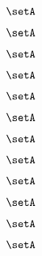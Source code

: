 \begin{forslides}
    \begin{equation}
        \label{eq:slides-translation-151}
        \setA
    \end{equation}

    \begin{equation}
        \label{eq:slides-translation-152}
        \setA
    \end{equation}

    \begin{equation}
        \label{eq:slides-translation-153}
        \setA
    \end{equation}

    \begin{equation}
        \label{eq:slides-translation-154}
        \setA
    \end{equation}

    \begin{equation}
        \label{eq:slides-translation-155}
        \setA
    \end{equation}

    \begin{equation}
        \label{eq:slides-translation-156}
        \setA
    \end{equation}

    \begin{equation}
        \label{eq:slides-translation-157}
        \setA
    \end{equation}

    \begin{equation}
        \label{eq:slides-translation-158}
        \setA
    \end{equation}

    \begin{equation}
        \label{eq:slides-translation-159}
        \setA
    \end{equation}
    
    \begin{equation}
        \label{eq:slides-translation-160}
        \setA
    \end{equation}

    \begin{equation}
        \label{eq:slides-translation-161}
        \setA
    \end{equation}

    \begin{equation}
        \label{eq:slides-translation-162}
        \setA
    \end{equation}


\end{forslides}
